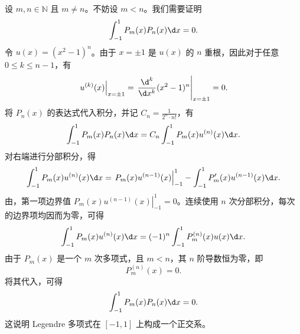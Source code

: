 \begin{myproof}
    设 $m, n \in \mathbb{N}$ 且 $m \neq n$。不妨设 $m < n$。我们需要证明
    \begin{equation}\label{eq:orth-target-7}
        \int_{-1}^{1} P_m(x) P_n(x) \d x = 0.
    \end{equation}
    令 $u(x) = (x^2 - 1)^n$。由于 $x = \pm 1$ 是 $u(x)$ 的 $n$ 重根，因此对于任意 $0 \leqslant k \leqslant n-1$，有
    \begin{equation}\label{eq:boundary-zero-7}
        \left. u^{(k)}(x) \right|_{x=\pm 1} = \left. \frac{\d^k}{\d x^k} (x^2 - 1)^n \right|_{x=\pm 1} = 0.
    \end{equation}
    将 $P_n(x)$ 的表达式代入积分，并记 $C_n = \frac{1}{2^n \cdot n!}$，有
    \begin{equation}\label{eq:integral-step1-7}
        \int_{-1}^{1} P_m(x) P_n(x) \d x = C_n \int_{-1}^{1} P_m(x) u^{(n)}(x) \d x.
    \end{equation}
    对右端进行分部积分，得
    \begin{equation}\label{eq:parts-step1-7}
        \int_{-1}^{1} P_m(x) u^{(n)}(x) \d x = \left. P_m(x) u^{(n-1)}(x) \right|_{-1}^{1} - \int_{-1}^{1} P'_m(x) u^{(n-1)}(x) \d x.
    \end{equation}
    由，第一项边界值 $\left. P_m(x) u^{(n-1)}(x) \right|_{-1}^{1} = 0$。连续使用 $n$ 次分部积分，每次的边界项均因而为零，可得
    \begin{equation}\label{eq:parts-n-7}
        \int_{-1}^{1} P_m(x) u^{(n)}(x) \d x = (-1)^n \int_{-1}^{1} P_m^{(n)}(x) u(x) \d x.
    \end{equation}
    由于 $P_m(x)$ 是一个 $m$ 次多项式，且 $m < n$，其 $n$ 阶导数恒为零，即
    \begin{equation}\label{eq:deriv-zero-7}
        P_m^{(n)}(x) = 0.
    \end{equation}
    将其代入，可得
    \begin{equation}\label{eq:orth-result-7}
        \int_{-1}^{1} P_m(x) P_n(x) \d x = 0.
    \end{equation}
    这说明 Legendre 多项式在 $[-1, 1]$ 上构成一个正交系。
\end{myproof}

